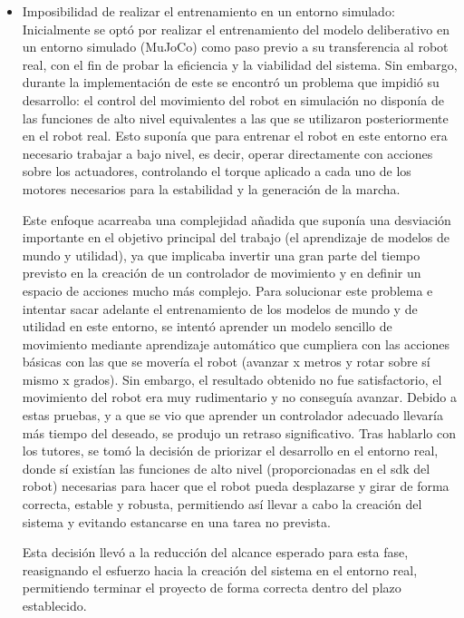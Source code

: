 \begin{itemize}
    \item Imposibilidad de realizar el entrenamiento en un entorno simulado:
    Inicialmente se optó por realizar el entrenamiento del modelo deliberativo en un entorno simulado (MuJoCo) como paso previo a su 
    transferencia al robot real, con el fin de probar la eficiencia y la viabilidad del sistema. Sin embargo, durante la implementación de 
    este se encontró un problema que impidió su desarrollo: el control del movimiento del robot en simulación no disponía de las funciones de 
    alto nivel equivalentes a las que se utilizaron posteriormente en el robot real. Esto suponía que para entrenar el robot en este entorno 
    era necesario trabajar a bajo nivel, es decir, operar directamente con acciones sobre los actuadores, controlando el torque aplicado a cada 
    uno de los motores necesarios para la estabilidad y la generación de la marcha.

    Este enfoque acarreaba una complejidad añadida que suponía una desviación importante en el objetivo principal del trabajo (el aprendizaje 
    de modelos de mundo y utilidad), ya que implicaba invertir una gran parte del tiempo previsto en la creación de un controlador de 
    movimiento y en definir un espacio de acciones mucho más complejo. Para solucionar este problema e intentar sacar adelante el entrenamiento de 
    los modelos de mundo y de utilidad en este entorno, se intentó aprender un modelo sencillo de movimiento mediante aprendizaje automático que 
    cumpliera con las acciones básicas con las que se movería el robot (avanzar x metros y rotar sobre sí mismo x grados). Sin embargo, el resultado 
    obtenido no fue satisfactorio, el movimiento del robot era muy rudimentario y no conseguía avanzar.
    Debido a estas pruebas, y a que se vio que aprender un controlador adecuado llevaría más tiempo del deseado, se produjo un retraso 
    significativo. Tras hablarlo con los tutores, se tomó la decisión de priorizar el desarrollo en el entorno real, donde sí existían las funciones 
    de alto nivel (proporcionadas en el \Gls{sdk} del robot) necesarias para hacer que el robot pueda desplazarse y girar de forma correcta, estable y robusta, 
    permitiendo así llevar a cabo la creación del sistema y evitando estancarse en una tarea no prevista.

    Esta decisión llevó a la reducción del alcance esperado para esta fase, reasignando el esfuerzo hacia la creación del sistema en el 
    entorno real, permitiendo terminar el proyecto de forma correcta dentro del plazo establecido.
 

\end{itemize}
